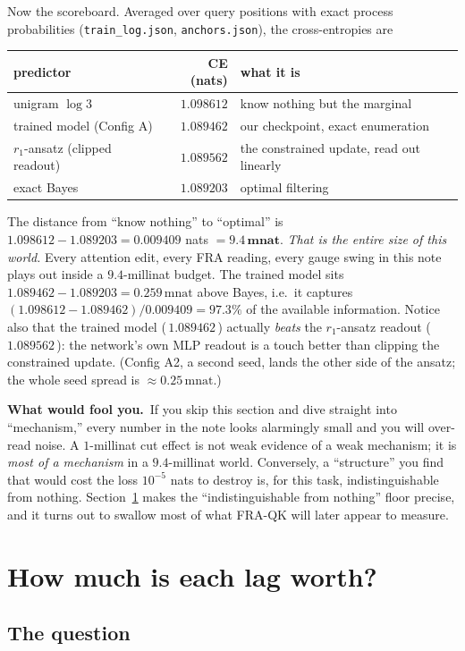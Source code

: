 \documentclass[11pt]{article}
\newcommand{\rone}{r_1}
\newcommand{\pmnat}{\,\text{mnat}}
\newcommand{\fool}[1]{\par\smallskip\noindent%
  \textbf{\textcolor{red!60!black}{What would fool you.}}~#1\par\smallskip}
\begin{document}
Now the scoreboard. Averaged over query positions with exact process
probabilities (\texttt{train\_log.json}, \texttt{anchors.json}), the
cross-entropies are
\begin{center}
\begin{tabular}{lrl}
\toprule
predictor & CE (nats) & what it is \\
\midrule
unigram $\log 3$ & $1.098612$ & know nothing but the marginal \\
trained model (Config A) & $1.089462$ & our checkpoint, exact enumeration \\
$\rone$-ansatz (clipped readout) & $1.089562$ & the constrained update, read out linearly \\
exact Bayes & $1.089203$ & optimal filtering \\
\bottomrule
\end{tabular}
\end{center}
The distance from ``know nothing'' to ``optimal'' is
$1.098612-1.089203 = 0.009409$ nats $=\mathbf{9.4\pmnat}$. \emph{That is the
entire size of this world.} Every attention edit, every FRA reading, every
gauge swing in this note plays out inside a $9.4$-millinat budget. The trained
model sits $1.089462-1.089203 = 0.259\pmnat$ above Bayes, i.e.\ it captures
$(1.098612-1.089462)/0.009409 = 97.3\%$ of the available information. Notice
also that the trained model (\,$1.089462$\,) actually \emph{beats} the
$\rone$-ansatz readout (\,$1.089562$\,): the network's own MLP readout is a
touch better than clipping the constrained update. (Config A2, a second seed,
lands the other side of the ansatz; the whole seed spread is $\approx
0.25\pmnat$.)

\fool{If you skip this section and dive straight into ``mechanism,'' every
number in the note looks alarmingly small and you will over-read noise. A
$1$-millinat cut effect is not weak evidence of a weak mechanism; it is
\emph{most of a mechanism} in a $9.4$-millinat world. Conversely, a
``structure'' you find that would cost the loss $10^{-5}$ nats to destroy is,
for this task, indistinguishable from nothing. Section~\ref{sec:ladder} makes
the ``indistinguishable from nothing'' floor precise, and it turns out to
swallow most of what FRA-QK will later appear to measure.}

\section{How much is each lag worth?}\label{sec:ladder}

\subsection{The question}
\end{document}
